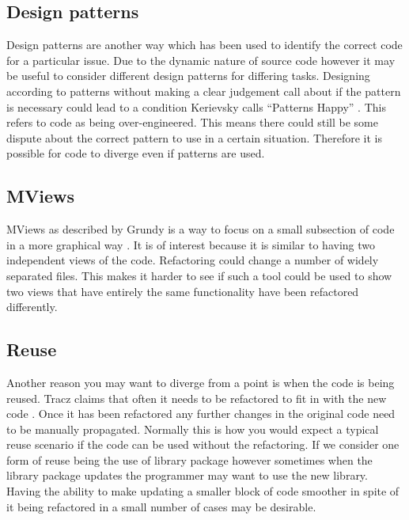 \documentclass[12pt]{CRPITStyle}
\renewcommand{\cite}{\citep}
\begin{document}
\subsection{Design patterns}
Design patterns are another way which has been used to identify the correct code for a particular issue. Due to the dynamic nature of source code however it may be useful to consider different design patterns for differing tasks. Designing according to patterns without making a clear judgement call about if the pattern is necessary could lead to a condition Kerievsky calls ``Patterns Happy'' \cite{Kerievsky2004}. This refers to code as being over-engineered. This means there could still be some dispute about the correct pattern to use in a certain situation. Therefore it is possible for code to diverge even if patterns are used.
\subsection{MViews}
MViews as described by Grundy is a way to focus on a small subsection of code in a more graphical way \cite{Grundya}. It is of interest because it is similar to having two independent views of the code. Refactoring could change a number of widely separated files. This makes it harder to see if such a tool could be used to show two views that have entirely the same functionality have been refactored differently. 
\subsection{Reuse}
Another reason you may want to diverge from a point is when the code is being reused. Tracz claims that often it needs to be refactored to fit in with the new code \cite{Tracz1995}. Once it has been refactored any further changes in the original code need to be manually propagated. Normally this is how you would expect a typical reuse scenario if the code can be used without the refactoring. If we consider one form of reuse being the use of library package however sometimes when the library package updates the programmer may want to use the new library. Having the ability to make updating a smaller block of code smoother in spite of it being refactored in a small number of cases may be desirable. 
\end{document}
